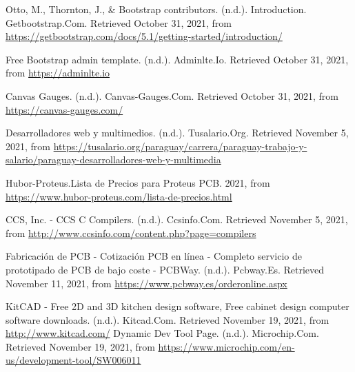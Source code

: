 \begin{thebibliography}{99}
 Otto, M., Thornton, J., \& Bootstrap contributors. (n.d.). Introduction. Getbootstrap.Com. Retrieved October 31, 2021, from \url{https://getbootstrap.com/docs/5.1/getting-started/introduction/}

 Free Bootstrap admin template. (n.d.). Adminlte.Io. Retrieved October 31, 2021, from \url{https://adminlte.io}

 Canvas Gauges. (n.d.). Canvas-Gauges.Com. Retrieved October 31, 2021, from \url{https://canvas-gauges.com/}



 Desarrolladores web y multimedios. (n.d.). Tusalario.Org. Retrieved November 5, 2021, from \url{https://tusalario.org/paraguay/carrera/paraguay-trabajo-y-salario/paraguay-desarrolladores-web-y-multimedia}

 Hubor-Proteus.Lista de Precios para Proteus PCB. 2021, from \url{https://www.hubor-proteus.com/lista-de-precios.html}

CCS, Inc. - CCS C Compilers. (n.d.). Ccsinfo.Com. Retrieved November 5, 2021, from \url{http://www.ccsinfo.com/content.php?page=compilers}

 Fabricación de PCB - Cotización PCB en línea - Completo servicio de prototipado de PCB de bajo coste - PCBWay. (n.d.). Pcbway.Es. Retrieved November 11, 2021, from \url{https://www.pcbway.es/orderonline.aspx}

 KitCAD - Free 2D and 3D kitchen design software, Free cabinet design computer software downloads. (n.d.). Kitcad.Com. Retrieved November 19, 2021, from \url{http://www.kitcad.com/}
 Dynamic Dev Tool Page. (n.d.). Microchip.Com. Retrieved November 19, 2021, from \url{https://www.microchip.com/en-us/development-tool/SW006011}




\end{thebibliography}